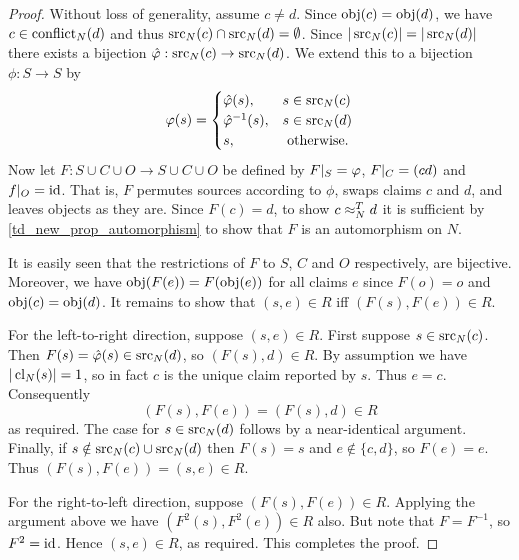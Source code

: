 \begin{proof}
    Without loss of generality, assume $c \ne d$. Since $\operatorname{obj}(c) = \operatorname{obj}(d)$, we
    have $c \in \operatorname{conflict}_N(d)$ and thus $\operatorname{src}_N(c) \cap \operatorname{src}_N(d) =
    \emptyset$. Since $|\operatorname{src}_N(c)| = |\operatorname{src}_N(d)|$ there exists a bijection
    $\hat{\varphi}: \operatorname{src}_N(c) \to \operatorname{src}_N(d)$. We extend this to a bijection $\phi:
    S \to S$ by
    \[
        \varphi(s) = \begin{cases}
            \hat{\varphi}(s),& s \in \operatorname{src}_N(c) \\
            \hat{\varphi}^{-1}(s),& s \in \operatorname{src}_N(d) \\
            s,& \text{ otherwise}.
        \end{cases}
    \]
    Now let $F: S \cup C \cup O \to S \cup C \cup O$ be defined by
    $F|_{S} = \varphi$, $F|_{C} = (cd)$ and $f|_{O} =
    \operatorname{id}$. That is, $F$ permutes sources according to $\phi$, swaps claims
    $c$ and $d$, and leaves objects as they are. Since $F(c) = d$, to show $c
    \approx_N^T d$ it is sufficient by \cref{td_new_prop_automorphism} to show
    that $F$ is an automorphism on $N$.

    It is easily seen that the restrictions of $F$ to $S$, $C$ and $O$
    respectively, are bijective. Moreover, we have $\operatorname{obj}(F(e)) = F(\operatorname{obj}(e))$
    for all claims $e$ since $F(o) = o$ and $\operatorname{obj}(c) = \operatorname{obj}(d)$. It remains to
    show that $(s, e) \in R$ iff $(F(s), F(e)) \in R$.

    For the left-to-right direction, suppose $(s, e) \in R$. First suppose $s
    \in \operatorname{src}_N(c)$. Then $F(s) = \hat{\varphi}(s) \in \operatorname{src}_N(d)$, so $(F(s), d)
    \in R$. By assumption we have $|\operatorname{cl}_N(s)| = 1$, so in fact $c$ is the
    unique claim reported by $s$. Thus $e = c$. Consequently
    \[
        (F(s), F(e)) = (F(s), d) \in R
    \]
    as required. The case for $s \in \operatorname{src}_N(d)$ follows by a near-identical
    argument. Finally, if $s \notin \operatorname{src}_N(c) \cup \operatorname{src}_N(d)$ then $F(s) = s$
    and $e \notin \{c, d\}$, so $F(e) = e$. Thus $(F(s), F(e)) = (s, e) \in R$.

    For the right-to-left direction, suppose $(F(s), F(e)) \in R$. Applying the
    argument above we have $(F^2(s), F^2(e)) \in R$ also. But note that $F
    = F^{-1}$, so $F^2 = \operatorname{id}$. Hence $(s, e) \in R$, as required.
    This completes the proof.
\end{proof}

